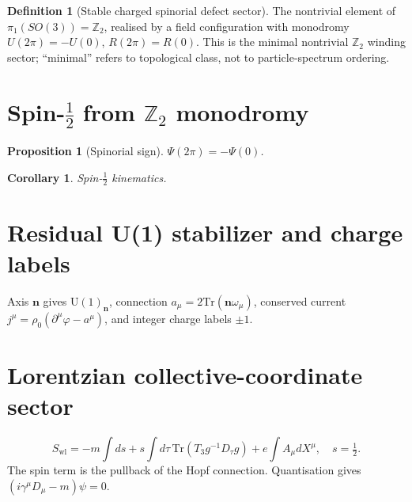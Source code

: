 \documentclass[12pt]{article}
\newtheorem{proposition}[theorem]{Proposition}
\newtheorem{corollary}[theorem]{Corollary}
\theoremstyle{definition}
\newtheorem{definition}[theorem]{Definition}
\theoremstyle{remark}
\begin{document}
\begin{definition}[Stable charged spinorial defect sector]
\label{def:defect}
The nontrivial element of $\pi_1(SO(3))=\mathbb{Z}_2$, realised by a field
configuration with monodromy $U(2\pi)=-U(0)$, $R(2\pi)=R(0)$.
This is the minimal nontrivial $\mathbb{Z}_2$ winding sector; ``minimal''
refers to topological class, not to particle-spectrum ordering.
\end{definition}

\section{Spin-$\tfrac{1}{2}$ from $\mathbb{Z}_2$ monodromy}
\label{sec:spin}

\begin{proposition}[Spinorial sign]
\label{prop:spinorial}
$\Psi(2\pi)=-\Psi(0)$.
\end{proposition}

\begin{corollary}Spin-$\tfrac{1}{2}$ kinematics.\end{corollary}

\section{Residual U(1) stabilizer and charge labels}
\label{sec:charge}

Axis $\mathbf{n}$ gives $\mathrm{U}(1)_{\mathbf{n}}$, connection
$a_\mu=2\mathrm{Tr}(\mathbf{n}\omega_\mu)$, conserved current
$j^\mu=\rho_0(\partial^\mu\varphi-a^\mu)$, and integer charge labels $\pm 1$.

\section{Lorentzian collective-coordinate sector}
\label{sec:collective}

\begin{equation}
S_{\mathrm{wl}}=-m\int ds
+s\!\int\!d\tau\,\mathrm{Tr}(T_3 g^{-1}D_\tau g)
+e\!\int\! A_\mu dX^\mu,\quad s=\tfrac{1}{2}.
\label{eq:Swl}
\end{equation}
The spin term is the pullback of the Hopf connection.
Quantisation gives $(i\gamma^\mu D_\mu-m)\psi=0$.
\end{document}
